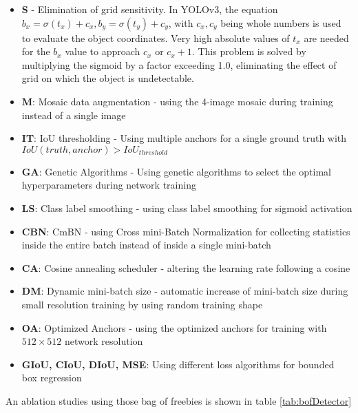 \begin{itemize}
	\item \textbf{S} -  Elimination of grid sensitivity. In YOLOv3, the equation $b_x = \sigma(t_x) + c_x, b_y = \sigma(t_y) + c_y$, with $c_x, c_y$ being whole numbers is used to evaluate the object coordinates. Very high absolute values of $t_x$ are needed for the $b_x$ value to approach $c_x$ or $c_x + 1$. This problem is solved by multiplying the sigmoid by a factor exceeding 1.0, eliminating the effect of grid on which the object is undetectable.
	\item \textbf{M}: Mosaic data augmentation - using the 4-image mosaic during training instead of a single image
	\item \textbf{IT}: IoU thresholding - Using multiple anchors for a single ground truth with $IoU(truth, anchor) > IoU_{threshold}$
	\item \textbf{GA}: Genetic Algorithms - Using genetic algorithms to select the optimal hyperparameters during network training 
	\item \textbf{LS}: Class label smoothing - using class label smoothing for sigmoid activation
	\item \textbf{CBN}: CmBN - using Cross mini-Batch Normalization for collecting statistics inside the entire batch instead of inside a single mini-batch
	\item \textbf{CA}: Cosine annealing scheduler - altering the learning rate following a cosine
	\item \textbf{DM}: Dynamic mini-batch size - automatic increase of mini-batch size during small resolution training by using random training shape
	\item \textbf{OA}: Optimized Anchors - using the optimized anchors for training with $512 \times 512$ network resolution
	\item \textbf{GIoU, CIoU, DIoU, MSE}: Using different loss algorithms for bounded box regression
\end{itemize}

An ablation studies using those bag of freebies is shown in table \ref{tab:bofDetector}


